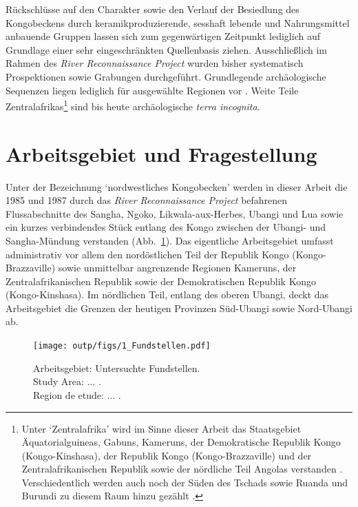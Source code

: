 Rückschlüsse auf den Charakter sowie den Verlauf der Besiedlung des Kongobeckens durch keramikproduzierende, sesshaft lebende und Nahrungsmittel anbauende Gruppen lassen sich zum gegenwärtigen Zeitpunkt lediglich auf Grundlage einer sehr eingeschränkten Quellenbasis ziehen. Ausschließlich im Rahmen des \textit{River Reconnaissance Project} wurden bisher systematisch Prospektionen sowie Grabungen durchgeführt. Grundlegende archäologische Sequenzen liegen lediglich für ausgewählte Regionen vor \parencites{Wotzka.1995}{MbidaMindzie.19951996}{AssokoNdong.20002001}{Clist.20042005}{Lavachery.2010}. Weite Teile Zentralafrikas\footnote{Unter \enquote*{Zentralafrika} wird im Sinne dieser Arbeit das Staatsgebiet Äquatorialguineas, Gabuns, Kameruns, der Demokratische Republik Kongo (Kongo-Kinshasa), der Republik Kongo (Kongo-Brazzaville) und der Zentralafrikanischen Republik sowie der nördliche Teil Angolas verstanden \parencite{Eggert.2014}. Verschiedentlich werden auch noch der Süden des Tschads sowie Ruanda und Burundi zu diesem Raum hinzu gezählt \parencite{Maret.2005}.} sind bis heute archäologische \textit{terra incognita}.

\section{Arbeitsgebiet und Fragestellung}\label{sec:Arbeitsgebiet}

Unter der Bezeichnung \enquote*{nordwestliches Kongobecken} werden in dieser Arbeit die 1985 und 1987 durch das \textit{River Reconnaissance Project} befahrenen Flussabschnitte des Sangha, Ngoko, Likwala-aux-Herbes, Ubangi und Lua sowie ein kurzes verbindendes Stück entlang des Kongo zwischen der Ubangi- und Sangha-Mündung verstanden (Abb.~\ref{fig:ArbeitsgebietKarte}). Das eigentliche Arbeitsgebiet umfasst administrativ vor allem den nordöstlichen Teil der Republik Kongo (Kongo-Brazzaville) sowie unmittelbar angrenzende Regionen Kameruns, der Zentralafrikanischen Republik sowie der Demokratischen Republik Kongo (Kongo-Kinshasa). Im nördlichen Teil, entlang des oberen Ubangi, deckt das Arbeitsgebiet die Grenzen der heutigen Provinzen Süd-Ubangi sowie Nord-Ubangi ab.

\begin{figure}[p]
	\centering
	\texttt{[image: outp/figs/1\_Fundstellen.pdf]}
	\caption{Arbeitsgebiet: Untersuchte Fundstellen. \\ Study Area: ... . \\ Region de etude: ... .}
	\label{fig:ArbeitsgebietKarte}
\end{figure}

